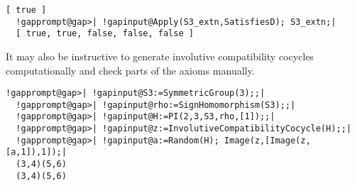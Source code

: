 \documentclass[a4paper,11pt]{report}
\begin{document}
{{\begin{Verbatim}[commandchars=!@|,fontsize=\small,frame=single,label=Example]
  [ true ]
  !gapprompt@gap>| !gapinput@Apply(S3_extn,SatisfiesD); S3_extn;|
  [ true, true, false, false, false ]
\end{Verbatim}
 It may also be instructive to generate involutive compatibility cocycles
computationally and check parts of the axioms manually. 
\begin{Verbatim}[commandchars=!@|,fontsize=\small,frame=single,label=Example]
  !gapprompt@gap>| !gapinput@S3:=SymmetricGroup(3);;|
  !gapprompt@gap>| !gapinput@rho:=SignHomomorphism(S3);;|
  !gapprompt@gap>| !gapinput@H:=PI(2,3,S3,rho,[1]);;|
  !gapprompt@gap>| !gapinput@z:=InvolutiveCompatibilityCocycle(H);;|
  !gapprompt@gap>| !gapinput@a:=Random(H); Image(z,[Image(z,[a,1]),1]);|
  (3,4)(5,6)
  (3,4)(5,6)
\end{Verbatim}
 }

 }

   
\end{document}
